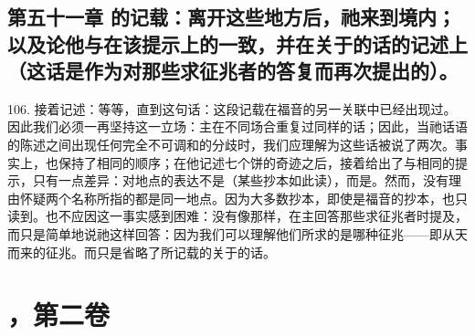 
\section{}


\subsection{第五十一章 的记载：离开这些地方后，祂来到境内；以及论他与在该提示上的一致，并在关于的话的记述上（这话是作为对那些求征兆者的答复而再次提出的）。}

106. 接着记述：等等，直到这句话：这段记载在福音的另一关联中已经出现过。因此我们必须一再坚持这一立场：主在不同场合重复过同样的话；因此，当祂话语的陈述之间出现任何完全不可调和的分歧时，我们应理解为这些话被说了两次。事实上，也保持了相同的顺序；在他记述七个饼的奇迹之后，接着给出了与相同的提示，只有一点差异：对地点的表达不是（某些抄本如此读），而是。然而，没有理由怀疑两个名称所指的都是同一地点。因为大多数抄本，即使是福音的抄本，也只读到。也不应因这一事实感到困难：没有像那样，在主回答那些求征兆者时提及，而只是简单地说祂这样回答：因为我们可以理解他们所求的是哪种征兆——即从天而来的征兆。而只是省略了所记载的关于的话。\par



\section{，第二卷}

